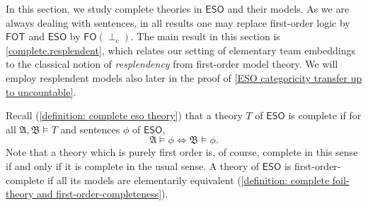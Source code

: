 \documentclass[a4paper]{amsart}
\theoremstyle{definition}
\theoremstyle{remark}
\newcommand{\A}{\mathcal{A}}
\newcommand{\B}{\mathcal{B}}
\newcommand\fot{\mathsf{FOT}}
\newcommand\eso{\mathsf{ESO}}
\newcommand\foil{\mathsf{FO}(\perp_c)}
\theoremstyle{definition}
\renewcommand{\A}{\mathfrak{A}}
\renewcommand{\B}{\mathfrak{B}}
\begin{document}
In this section, we study complete theories in $\eso$ and their models. As we are always dealing with sentences, in all results one may replace first-order logic by $\fot$ and $\eso$ by $\foil$. The main result in this section is \cref{complete.resplendent}, which relates our setting of elementary team embeddings to the classical notion of \emph{resplendency} from first-order model theory. We will employ resplendent models also later in the proof of \cref{ESO categoricity transfer up to uncountable}.


Recall (\cref{definition: complete eso theory}) that a theory $T$ of $\eso$ is complete if for all $\A,\B\models T$ and sentences $\phi$ of $\eso$,
\[
    \A\models\phi \iff \B\models\phi.
\]
Note that a theory which is purely first order is, of course, complete in this sense if and only if it is complete in the usual sense. A theory of $\eso$ is first-order-complete if all its models are elementarily equivalent (\cref{definition: complete foil-theory and first-order-completeness}).
\end{document}
